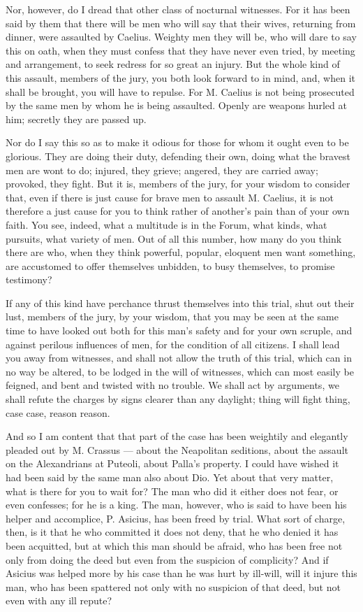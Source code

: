  Nor, however, do I dread that other class of nocturnal witnesses. For it has been said by them that there will be men who will say that their wives, returning from dinner, were assaulted by Caelius. Weighty men they will be, who will dare to say this on oath, when they must confess that they have never even tried, by meeting and arrangement, to seek redress for so great an injury. But the whole kind of this assault, members of the jury, you both look forward to in mind, and, when it shall be brought, you will have to repulse. For M. Caelius is not being prosecuted by the same men by whom he is being assaulted. Openly are weapons hurled at him; secretly they are passed up.

 Nor do I say this so as to make it odious for those for whom it ought even to be glorious. They are doing their duty, defending their own, doing what the bravest men are wont to do; injured, they grieve; angered, they are carried away; provoked, they fight. But it is, members of the jury, for your wisdom to consider that, even if there is just cause for brave men to assault M. Caelius, it is not therefore a just cause for you to think rather of another's pain than of your own faith. You see, indeed, what a multitude is in the Forum, what kinds, what pursuits, what variety of men. Out of all this number, how many do you think there are who, when they think powerful, popular, eloquent men want something, are accustomed to offer themselves unbidden, to busy themselves, to promise testimony?

 If any of this kind have perchance thrust themselves into this trial, shut out their lust, members of the jury, by your wisdom, that you may be seen at the same time to have looked out both for this man's safety and for your own scruple, and against perilous influences of men, for the condition of all citizens. I shall lead you away from witnesses, and shall not allow the truth of this trial, which can in no way be altered, to be lodged in the will of witnesses, which can most easily be feigned, and bent and twisted with no trouble. We shall act by arguments, we shall refute the charges by signs clearer than any daylight; thing will fight thing, case case, reason reason.

 And so I am content that that part of the case has been weightily and elegantly pleaded out by M. Crassus --- about the Neapolitan seditions, about the assault on the Alexandrians at Puteoli, about Palla's property. I could have wished it had been said by the same man also about Dio. Yet about that very matter, what is there for you to wait for? The man who did it either does not fear, or even confesses; for he is a king. The man, however, who is said to have been his helper and accomplice, P. Asicius, has been freed by trial. What sort of charge, then, is it that he who committed it does not deny, that he who denied it has been acquitted, but at which this man should be afraid, who has been free not only from doing the deed but even from the suspicion of complicity? And if Asicius was helped more by his case than he was hurt by ill-will, will it injure this man, who has been spattered not only with no suspicion of that deed, but not even with any ill repute?

